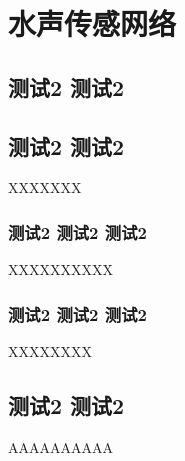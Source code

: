 \chapter{水声传感网络 }
\section{测试2 测试2 }
\section{测试2 测试2 }
XXXXXXX
\subsection{测试2 测试2 测试2 }
XXXXXXXXXX
\subsection{测试2 测试2 测试2 }
XXXXXXXX
\section{测试2 测试2 }
AAAAAAAAAA
\endinput